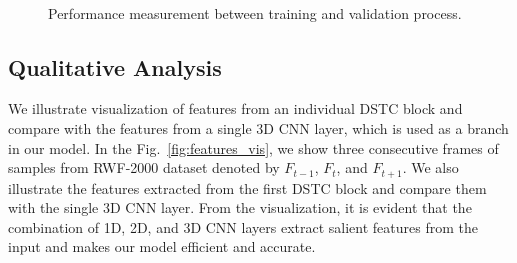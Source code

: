     


\begin{figure}
    \centering
    \\
    \caption{Performance measurement between training and validation process.}
    \label{fig:mdcn_train_vs_val}
\end{figure}

	\subsection{Qualitative Analysis}
We illustrate visualization of features from an individual DSTC block and compare with the features from a single 3D CNN layer, which is used as a branch in our model. 
In the Fig.~\ref{fig:features_vis}, we show three consecutive frames of samples from RWF-2000 dataset denoted by $F_{t-1}$, $F_t$, and $F_{t+1}$. 
We also illustrate the features extracted from the first DSTC block and compare them with the single 3D CNN layer. 
From the visualization, it is evident that the combination of 1D, 2D, and 3D CNN layers extract salient features from the input and makes our model efficient and accurate.



